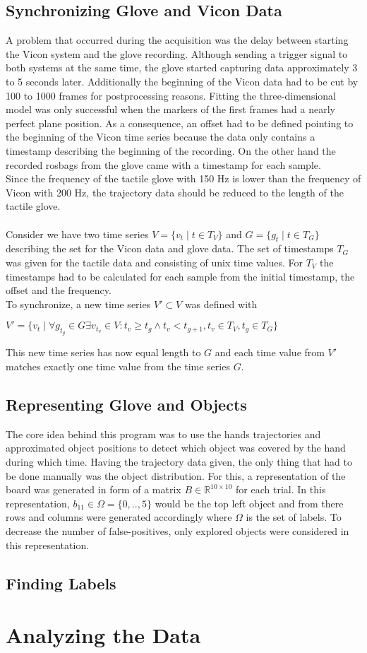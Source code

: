 \subsection{Synchronizing Glove and Vicon Data}
A problem that occurred during the acquisition was the delay between starting the Vicon system and the glove recording. Although sending a trigger signal to both systems at the same time, the glove started capturing data approximately 3 to 5 seconds later. Additionally the beginning of the Vicon data had to be cut by 100 to 1000 frames for postprocessing reasons. Fitting the three-dimensional model was only successful when the markers of the first frames had a nearly perfect plane position. As a consequence, an offset had to be defined pointing to the beginning of the Vicon time series because the data only contains a timestamp describing the beginning of the recording. On the other hand the recorded rosbags from the glove came with a timestamp for each sample.\\
Since the frequency of the tactile glove with 150 Hz is lower than the frequency of Vicon with 200 Hz, the trajectory data should be reduced to the length of the tactile glove.\\
\\
Consider we have two time series $V = \{v_{t} \mid t\in T_{V}\}$ and $G = \{g_{t} \mid t\in T_{G}\}$ describing the set for the Vicon data and glove data. The set of timestamps $T_{G}$ was given for the tactile data and consisting of unix time values. For $T_{V}$ the timestamps had to be calculated for each sample from the initial timestamp, the offset and the frequency. \\
To synchronize, a new time series $V' \subset V$ was defined with \begin{center}
$V' = \{v_{t} \mid \forall g_{t_{g}} \in G \exists v_{t_{v}} \in V : t_{v} \geq t_{g} \wedge t_{v} < t_{g+1}, t_{v} \in T_{V}, t_{g} \in T_{G} \}$
\end{center}
This new time series has now equal length to $G$ and each time value from $V'$ matches exactly one time value from the time series $G$.
\subsection{Representing Glove and Objects}
The core idea behind this program was to use the hands trajectories and approximated object positions to detect which object was covered by the hand during which time. Having the trajectory data given, the only thing that had to be done manually was the object distribution. For this, a representation of the board was generated in form of a matrix $B \in \mathbb{R}^{10 \times 10}$ for each trial. In this representation, $b_{11} \in \Omega=\{0,..,5\}$ would be the top left object and from there rows and columns were generated accordingly where $\Omega$ is the set of labels. To decrease the number of false-positives, only explored objects were considered in this representation.

\subsection{Finding Labels}
\section{Analyzing the Data}